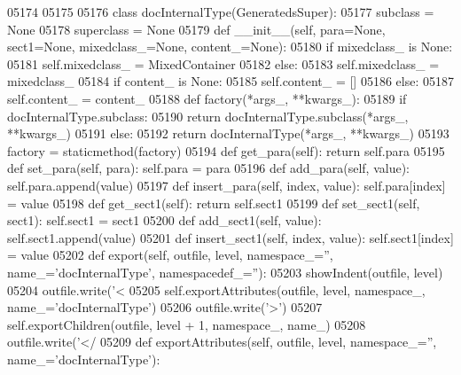 \begin{DoxyCode}
{{{{{{{{{{{{{{{{{{{{{{{{{{{{{{{{{{{{{{{{{{{{{{{{{{{{{{{{{{{{{{{{{{{{{{{{{{{{{{{{{{{{{{{{{{{{{{{{{{{{{{{{{{{{{{{{{{{{{{{{{{{{{{{{{{{{{{{{{{{{{{{{{{{{{{{{{{{{{{{{{{{{{{{{{{{{{{{{{{{{{{{{{{{{{{{{{{{{{{{{{{{{{{{{{{{{{{{{{{{{{{{{{{{{{{{{{{{{{{{{{{{{{{{{{{{{{{{{{{{{{{{{{{{{{{{{{{{{{{{{{{{{{{{{{{{{{{{{{{{{{{{{{{{{{{{{{{{{{{{{{{{{{{{{{{{{{{{{05174 
05175 
05176 \textcolor{keyword}{class }docInternalType(GeneratedsSuper):
05177     subclass = \textcolor{keywordtype}{None}
05178     superclass = \textcolor{keywordtype}{None}
05179     \textcolor{keyword}{def }__init__(self, para=None, sect1=None, mixedclass\_=None, content\_=None):
05180         \textcolor{keywordflow}{if} mixedclass\_ \textcolor{keywordflow}{is} \textcolor{keywordtype}{None}:
05181             self.mixedclass_ = MixedContainer
05182         \textcolor{keywordflow}{else}:
05183             self.mixedclass_ = mixedclass\_
05184         \textcolor{keywordflow}{if} content\_ \textcolor{keywordflow}{is} \textcolor{keywordtype}{None}:
05185             self.content_ = []
05186         \textcolor{keywordflow}{else}:
05187             self.content_ = content\_
05188     \textcolor{keyword}{def }factory(*args\_, **kwargs\_):
05189         \textcolor{keywordflow}{if} docInternalType.subclass:
05190             \textcolor{keywordflow}{return} docInternalType.subclass(*args\_, **kwargs\_)
05191         \textcolor{keywordflow}{else}:
05192             \textcolor{keywordflow}{return} docInternalType(*args\_, **kwargs\_)
05193     factory = staticmethod(factory)
05194     \textcolor{keyword}{def }get_para(self): \textcolor{keywordflow}{return} self.para
05195     \textcolor{keyword}{def }set_para(self, para): self.para = para
05196     \textcolor{keyword}{def }add_para(self, value): self.para.append(value)
05197     \textcolor{keyword}{def }insert_para(self, index, value): self.para[index] = value
05198     \textcolor{keyword}{def }get_sect1(self): \textcolor{keywordflow}{return} self.sect1
05199     \textcolor{keyword}{def }set_sect1(self, sect1): self.sect1 = sect1
05200     \textcolor{keyword}{def }add_sect1(self, value): self.sect1.append(value)
05201     \textcolor{keyword}{def }insert_sect1(self, index, value): self.sect1[index] = value
05202     \textcolor{keyword}{def }export(self, outfile, level, namespace\_='', name\_='docInternalType', namespacedef\_=''):
05203         showIndent(outfile, level)
05204         outfile.write(\textcolor{stringliteral}{'<%
05205         self.exportAttributes(outfile, level, namespace\_, name\_=\textcolor{stringliteral}{'docInternalType'})
05206         outfile.write(\textcolor{stringliteral}{'>'})
05207         self.exportChildren(outfile, level + 1, namespace\_, name\_)
05208         outfile.write(\textcolor{stringliteral}{'</%
05209     \textcolor{keyword}{def }exportAttributes(self, outfile, level, namespace\_='', name\_='docInternalType'):
}}}}}}}}}}}}}}}}}}}}}}}}}}}}}}}}}}}}}}}}}}}}}}}}}}}}}}}}}}}}}}}}}}}}}}}}}}}}}}}}}}}}}}}}}}}}}}}}}}}}}}}}}}}}}}}}}}}}}}}}}}}}}}}}}}}}}}}}}}}}}}}}}}}}}}}}}}}}}}}}}}}}}}}}}}}}}}}}}}}}}}}}}}}}}}}}}}}}}}}}}}}}}}}}}}}}}}}}}}}}}}}}}}}}}}}}}}}}}}}}}}}}}}}}}}}}}}}}}}}}}}}}}}}}}}}}}}}}}}}}}}}}}}}}}}}}}}}}}}}}}}}}}}}}}}}}}}}}}}}}}}}}}}}}}}}}}}}}}}
\end{DoxyCode}
